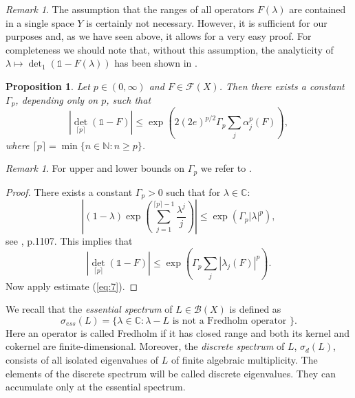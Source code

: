 \documentclass[12pt,a4paper]{article}
\newtheorem{prop}[theorem]{Proposition}
\theoremstyle{definition}
\theoremstyle{remark}
\newtheorem {rem}[theorem]{Remark}
\numberwithin{equation}{section}
\newcommand{\mn}{{\mathbb N}}
\newcommand{\mc}{{\mathbb C}}
\newcommand{\bdd}{\mathcal{B}}
\begin{document}
\begin{rem}
  The assumption that the ranges of all operators $F(\lambda)$ are contained in a single space $Y$ is certainly not necessary. However, it is sufficient for our purposes and, as we have seen above, it allows for a very easy proof. For completeness we should note that, without this assumption, the analyticity of $\lambda \mapsto {\det_1}(\mathds{1}-F(\lambda))$ has been shown in \cite{MR0417827}. 
\end{rem} 
\begin{prop}\label{prop02}
Let $p \in (0,\infty)$ and $F \in \mathcal{F}(X)$. Then there exists a constant $\Gamma_p$, depending only on $p$, such that 
\begin{equation}
  \label{eq:2}
  |{\det}_{\lceil p \rceil} (\mathds{1}-F)| \leq \exp\left( 2(2e)^{p/2} \Gamma_p \sum_{j} \alpha_j^p(F) \right),
\end{equation}
where $\lceil p \rceil = \min\{ n \in \mn: n \geq p\}$. 
\end{prop}
\begin{rem} 
 For upper and lower bounds on $\Gamma_p$ we refer to  \cite{MR2391269}. 
\end{rem}
\begin{proof}
There exists a constant $\Gamma_p>0$ such that for  $\lambda \in \mc$: 
$$ \left|(1-\lambda)\exp\left( \sum_{j=1}^{\lceil p \rceil-1} \frac{\lambda^j}{j} \right)\right| \leq \exp(\Gamma_p |\lambda|^p),$$
see \cite{MR1009163}, p.1107. This implies that 
$$   |{\det}_{\lceil p \rceil} (\mathds{1}-F)| \leq \exp\left( \Gamma_p \sum_{j} |\lambda_j(F)|^p \right).$$
Now apply estimate (\ref{eq:7}).
\end{proof}
We recall that the \emph{essential spectrum} of $L \in \bdd(X)$ is defined as 
\begin{equation}
  \label{eq:4}
  \sigma_{ess}(L)=\{ \lambda \in \mc : \lambda - L \text{ is not a Fredholm operator } \}.
\end{equation}
Here an operator is called Fredholm if it has closed range and both its kernel and cokernel are finite-dimensional.
Moreover, the \emph{discrete spectrum} of $L$, $\sigma_d(L)$, consists of all isolated eigenvalues of $L$ of finite algebraic multiplicity. The elements of the discrete spectrum will be called discrete eigenvalues. They can accumulate only at the essential spectrum. 
\end{document}
